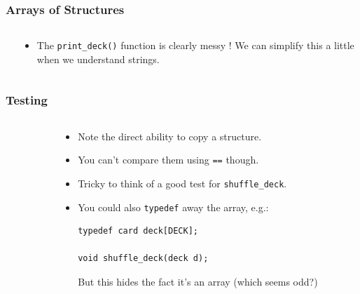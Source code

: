 \begin{frame}[fragile]
\frametitle{Arrays of Structures}
\begin{columns}

\begin{column}{0.45\textwidth}

\end{column}

\begin{column}{0.45\textwidth}
\begin{itemize}[<+->]
\item The \verb^print_deck()^ function is clearly messy ! We can simplify this a little when we understand strings.
\end{itemize}
\end{column}

\end{columns}
\end{frame}

\begin{frame}[fragile]
\frametitle{Testing}
\begin{columns}

\begin{column}{0.50\textwidth}

\end{column}

\begin{column}{0.45\textwidth}
\begin{itemize}[<+->]
\item Note the direct ability to copy a structure.
\item You can't compare them using \verb^==^ though.
\item Tricky to think of a good test for \verb^shuffle_deck^.
\item You could also \verb^typedef^ away the array, e.g.:
\begin{verbatim}
typedef card deck[DECK];

void shuffle_deck(deck d);
\end{verbatim}
But this hides the fact it's an array (which seems odd?)
\end{itemize}
\end{column}

\end{columns}
\end{frame}
